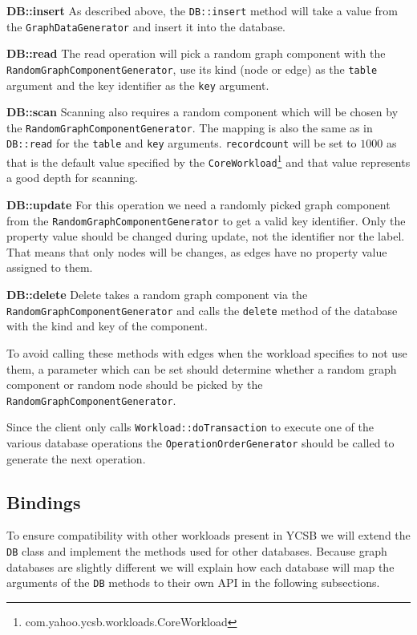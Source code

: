 \textbf{DB::insert} \newline
As described above,
the \texttt{DB::insert} method will take a value from the \texttt{GraphDataGenerator} and insert it into the database.

\textbf{DB::read} \newline
The read operation will pick a random graph component with the \texttt{RandomGraphComponentGenerator},
use its kind (node or edge) as the \texttt{table} argument and the key identifier as the \texttt{key} argument.

\textbf{DB::scan} \newline
Scanning also requires a random component which will be chosen by the \texttt{RandomGraphComponentGenerator}.
The mapping is also the same as in \texttt{DB::read} for the \texttt{table} and \texttt{key} arguments.
\texttt{recordcount} will be set to $ 1000 $ as that is the default value specified by the \texttt{CoreWorkload}\footnote{com.yahoo.ycsb.workloads.CoreWorkload} and that value represents a good depth for scanning.

\textbf{DB::update} \newline
For this operation we need a randomly picked graph component from the \texttt{RandomGraphComponentGenerator} to get a valid key identifier.
Only the property value should be changed during update,
not the identifier nor the label.
That means that only nodes will be changes,
as edges have no property value assigned to them.

\textbf{DB::delete} \newline
Delete takes a random graph component via the \texttt{RandomGraphComponentGenerator} and calls the \texttt{delete} method of the database with the kind and key of the component.

To avoid calling these methods with edges when the workload specifies to not use them,
a parameter which can be set should determine whether a random graph component or random node should be picked by the \texttt{RandomGraphComponentGenerator}.

Since the client only calls \texttt{Workload::doTransaction} to execute one of the various database operations the \texttt{OperationOrderGenerator} should be called to generate the next operation.

\subsection{Bindings}
\label{ch:design:se:bindings}
To ensure compatibility with other workloads present in YCSB we will extend the \texttt{DB} class and implement the methods used for other databases.
Because graph databases are slightly different we will explain how each database will map the arguments of the \texttt{DB} methods to their own API in the following subsections.

